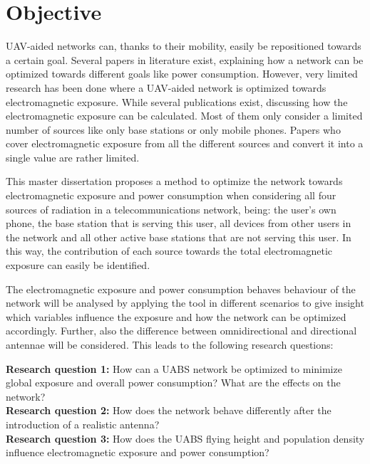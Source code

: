 \section{Objective}
\label{sec:objective}

\gls{UAV}-aided networks can, thanks to their mobility, easily be repositioned towards a certain goal. Several papers 
in literature exist, explaining how a network can be optimized towards different goals like power consumption.
However, very limited
research has been done where a \gls{UAV}-aided network is optimized towards  electromagnetic exposure.
While several publications exist, discussing how the electromagnetic exposure can be calculated. 
Most of them only consider a limited number of sources like only base stations or only mobile phones.
Papers who cover electromagnetic exposure from all the different sources and convert it into a single value are rather limited.

This master dissertation proposes a method to optimize the network towards electromagnetic exposure and power consumption
when considering all four sources of radiation in a telecommunications network, being: the user's own phone,
 the base station that is serving this user, 
all devices from other users in the network and all 
other active base stations that are not serving this user. In this way, the contribution of each source towards the total 
electromagnetic exposure can easily be identified. 

The electromagnetic exposure and power consumption behaves  behaviour of the network will be analysed by applying the tool in different scenarios 
to give insight which variables influence the exposure and how
the network can be optimized accordingly. Further, also the difference between omnidirectional and directional antennae will 
be considered. This leads to the following research questions:

\textbf{Research question 1:} How can a \gls{UABS} network be optimized to minimize global exposure and overall power consumption? 
What are the effects on the network?\\

\textbf{Research question 2:} How does the network behave differently after the introduction of a realistic antenna?\\

\textbf{Research question 3:} How does the \gls{UABS} flying height and population density influence electromagnetic 
exposure and power consumption?\\

